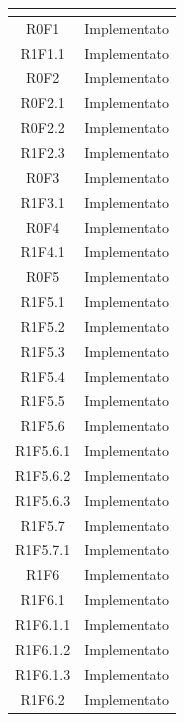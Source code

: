 \appendix
{}
\normalsize
\renewcommand{\arraystretch}{1.5}
\begin{longtable}{|c|c|}
	\hline
	\rowcolor{title_row}
	\textbf{\color{title_text}{Requisito}} & \textbf{\color{title_text}{Stato}} \\
	\hline
	\endhead
	{R0F1} & Implementato\\
	\hline
	{R1F1.1} & Implementato\\
	\hline
	{R0F2} & Implementato\\
	\hline
	{R0F2.1} & Implementato\\
	\hline
	{R0F2.2} & Implementato\\
	\hline
	{R1F2.3} & Implementato\\
	\hline
	{R0F3} & Implementato\\
	\hline
	{R1F3.1} & Implementato\\
	\hline
	{R0F4} & Implementato\\
	\hline
	{R1F4.1} & Implementato\\
	\hline
	{R0F5} & Implementato\\
	\hline
	{R1F5.1} & Implementato\\
	\hline
	{R1F5.2} & Implementato\\
	\hline
	{R1F5.3} & Implementato\\
	\hline
	{R1F5.4} & Implementato\\
	\hline
	{R1F5.5} & Implementato\\
	\hline
	{R1F5.6} & Implementato\\
	\hline
	{R1F5.6.1} & Implementato\\
	\hline
	{R1F5.6.2} & Implementato\\
	\hline
	{R1F5.6.3} & Implementato\\
	\hline
	{R1F5.7} & Implementato\\
	\hline
	{R1F5.7.1} & Implementato\\
	\hline
	{R1F6} & Implementato\\
	\hline
	{R1F6.1} & Implementato\\
	\hline
	{R1F6.1.1} & Implementato\\
	\hline
	{R1F6.1.2} & Implementato\\
	\hline
	{R1F6.1.3} & Implementato\\
	\hline
	{R1F6.2} & Implementato\\

\end{longtable}
